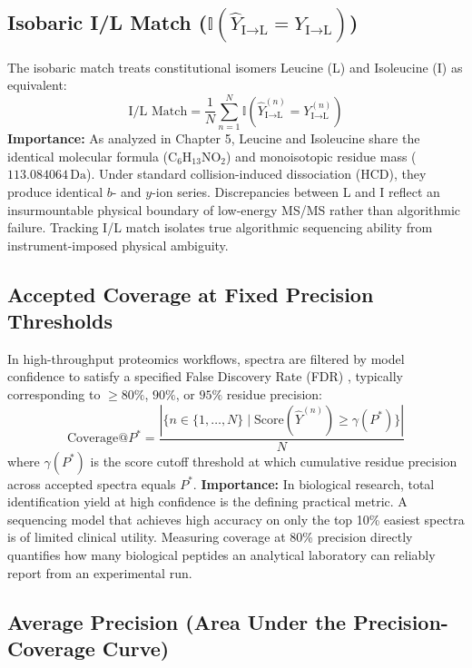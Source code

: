 \subsection{Isobaric I/L Match ($\mathbb{I}(\hat{Y}_{\text{I}\to\text{L}} = Y_{\text{I}\to\text{L}})$)}

The isobaric match treats constitutional isomers Leucine (L) and Isoleucine (I) as equivalent:
\begin{equation}
\text{I/L Match} = \frac{1}{N} \sum_{n=1}^N \mathbb{I}(\hat{Y}_{\text{I}\to\text{L}}^{(n)} = Y_{\text{I}\to\text{L}}^{(n)})
\label{eq:il_match}
\end{equation}
\textbf{Importance:} As analyzed in Chapter 5, Leucine and Isoleucine share the identical molecular formula ($\text{C}_6\text{H}_{13}\text{NO}_2$) and monoisotopic residue mass ($113.084064\,\text{Da}$). Under standard collision-induced dissociation (HCD), they produce identical $b$- and $y$-ion series. Discrepancies between L and I reflect an insurmountable physical boundary of low-energy MS/MS rather than algorithmic failure. Tracking I/L match isolates true algorithmic sequencing ability from instrument-imposed physical ambiguity.

\subsection{Accepted Coverage at Fixed Precision Thresholds}

In high-throughput proteomics workflows, spectra are filtered by model confidence to satisfy a specified False Discovery Rate (FDR) \citep{Elias2007}, typically corresponding to $\ge 80\%$, $90\%$, or $95\%$ residue precision:
\begin{equation}
\text{Coverage@}P^* = \frac{|\{n \in \{1, \dots, N\} \mid \text{Score}(\hat{Y}^{(n)}) \ge \gamma(P^*)\}|}{N}
\label{eq:coverage_threshold}
\end{equation}
where $\gamma(P^*)$ is the score cutoff threshold at which cumulative residue precision across accepted spectra equals $P^*$.
\textbf{Importance:} In biological research, total identification yield at high confidence is the defining practical metric. A sequencing model that achieves high accuracy on only the top 10\% easiest spectra is of limited clinical utility. Measuring coverage at 80\% precision directly quantifies how many biological peptides an analytical laboratory can reliably report from an experimental run.

\subsection{Average Precision (Area Under the Precision-Coverage Curve)}

